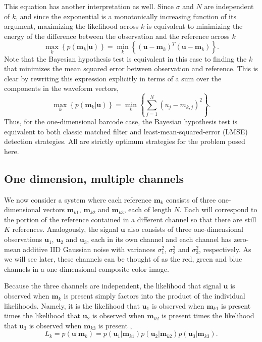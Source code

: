 This equation has another interpretation as well. Since $\sigma$ and $N$ are independent of $k$, and since the exponential is a monotonically increasing function of its argument, maximizing the likelihood across $k$ is equivalent to minimizing the energy of the difference between the observation and the reference across $k$ %
\begin{equation}
\max_k   \left\{ p(\mathbf{m}_k|\mathbf{u}) \right\} = \min_k  \left\{ (\mathbf{u}-\mathbf{m}_k)^T(\mathbf{u}-\mathbf{m}_k) \right\}. 
\end{equation}
Note that the Bayesian hypothesis test is equivalent in this case to finding the $k$ that minimizes the mean squared error between observation and reference. This is clear by rewriting this expression explicitly in terms of a sum over the components in the waveform vectors,
\begin{equation}
\max_k   \left\{ p(\mathbf{m}_k|\mathbf{u}) \right\} =  \min_k  \left\{ \sum_{j=1}^N  (u_j-m_{k,j})^2   \right\}. 
\end{equation}
Thus, for the one-dimensional barcode case, the Bayesian hypothesis test is equivalent to both classic matched filter and least-mean-squared-error (LMSE) detection strategies. All are strictly optimum strategies for the problem posed here.

\subsection{One dimension, multiple channels}\label{sec:simpleModel}
We now consider a system where each reference $\mathbf{m}_k$ consists of three one-dimensional vectors $\mathbf{m}_{k1}$, $\mathbf{m}_{k2}$ and $\mathbf{m}_{k3}$, each of length $N$. Each will correspond to the portion of the reference contained in a different channel so that there are still $K$ references. Analogously, the signal $\mathbf{u}$ also consists of three one-dimensional observations $\mathbf{u}_1$, $\mathbf{u}_2$ and $\mathbf{u}_3$, each in its own channel and each channel has zero-mean additive IID Gaussian noise with variances $\sigma_1^2$, $\sigma_2^2$ and $\sigma_3^2$, respectively. As we will see later, these channels can be thought of as the red, green and blue channels in a one-dimensional composite color image. 

Because the three channels are independent, the likelihood that signal $\mathbf{u}$ is observed when $\mathbf{m}_k$ is present simply factors into the product of the individual likelihoods. Namely, it is the likelihood that $\mathbf{u}_1$ is observed when $\mathbf{m}_{k1}$ is present times the likelihood that $\mathbf{u}_2$ is observed when $\mathbf{m}_{k2}$ is present times the likelihood that $\mathbf{u}_3$ is observed when $\mathbf{m}_{k3}$ is present \citep{bretthorst_probability_2003},
\begin{equation}
L_k = p(\mathbf{u}|\mathbf{m}_k) = p(\mathbf{u}_1|\mathbf{m}_{k1})p(\mathbf{u}_2|\mathbf{m}_{k2})p(\mathbf{u}_3|\mathbf{m}_{k3}).
\end{equation}

